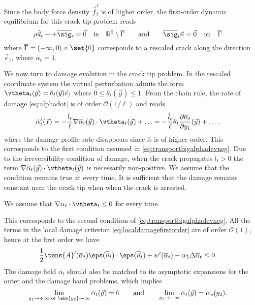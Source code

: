 Since the body force density $\vec{f}_t^\ell$ is of higher order, the first-order dynamic equilibrium for this crack tip problem reads
\begin{equation} \label{eq:waveequationattip}
\rho\ddot{\vec{u}}_t-\div\overline{\sig}_t=\vec{0}\quad\text{in}\quad\mathbb{R}^2\setminus\overline{\Gamma}\qquad\text{and}\qquad\overline{\sig}_t\vec{n}=\vec{0}\quad\text{on}\quad\overline{\Gamma}
\end{equation}
where $\overline{\Gamma}=(-\infty,0)\times\set{0}$ corresponds to a rescaled crack along the direction $\vec{e}_1$, where $\overline{\alpha}_t=1$.

We now turn to damage evolution in the crack tip problem. In the rescaled coordinate system the virtual perturbation admits the form $\vtheta_t(\vec{y})=\theta_t(\vec{y})\vec{e}_1$ where $0\leq\theta_t(\vec{y})\leq1$. From the chain rule, the rate of damage \eqref{eq:alphadot} is of order $\mathcal{O}(1/\ell)$ and reads
\begin{equation} \label{eq:alphadotcracktip}
\dot{\alpha}_t^\ell(\vec{x})=-\frac{\dot{l}_t}{\ell}\nabla\overline{\alpha}_t(\vec{y})\cdot\vtheta_t(\vec{y})+\ldots=-\frac{\dot{l}_t}{\ell}\theta_t\frac{\partial\overline{\alpha}_t}{\partial y_1}(\vec{y})+\ldots.
\end{equation}
where the damage profile rate disappears since it is of higher order. This corresponds to the first condition assumed in \eqref{eq:transportbigalphadevneg}. Due to the irreversibility condition of damage, when the crack propagates $\dot{l}_t>0$ the term $\nabla\overline{\alpha}_t(\vec{y})\cdot\vtheta_t(\vec{y})$ is necessarily non-positive. We assume that the condition remains true at every time. It is sufficient that the damage remains constant near the crack tip when when the crack is arrested.
\begin{hypothesis}
We assume that $\nabla\alpha_t\cdot\vtheta_t\leq 0$ for every time.
\end{hypothesis}
This corresponds to the second condition of \eqref{eq:transportbigalphadevneg}. All the terms in the local damage criterion \eqref{eq:localdamagefirstorder} are of order $\mathcal{O}(1)$, hence at the first order we have
\begin{equation} \label{eq:damageconditiontip}
\frac{1}{2}\tens{A}'(\overline{\alpha}_t)\eps(\overline{\vec{u}}_t)\cdot\eps(\overline{\vec{u}}_t)+w'(\overline{\alpha}_t)-w_1\Delta\overline{\alpha}_t\leq 0.
\end{equation}
The damage field $\overline{\alpha}_t$ should also be matched to its asymptotic expansions for the outer and the damage band problems, which implies
\begin{equation} \label{eq:asymalpha}
\lim_{y_1\to+\infty\text{ or }\abs{y_2}\to\infty}\overline{\alpha}_t(\vec{y})=0\qquad\text{and}\qquad\lim_{y_1\to-\infty}\overline{\alpha}_t(\vec{y})=\alpha_*(y_2).
\end{equation}

